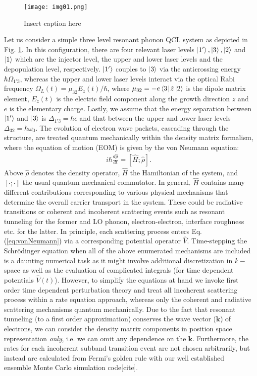 \documentclass[10pt,letterpaper]{article}
\begin{document}
\begin{figure}[h!]
\centering
\texttt{[image: img01.png]}
\caption{Insert caption here} \label{fig:img01}
\end{figure}

Let us consider a simple three level resonant phonon QCL system as depicted in Fig. \ref{fig:img01}. In this configuration, there are four relevant laser levels $\Ket{1'}, \Ket{3}, \Ket{2} $ and $\Ket{1}$ which are the injector level, the upper and lower laser levels and the depopulation level, respectively. $\Ket{1'}$ couples to $\Ket{3}$ via the anticrossing energy $\hbar\Omega_{1'3}$, whereas the upper and lower laser levels interact via the optical Rabi frequency $\Omega_L(t)= \mu_{32}E_z(t)/\hbar$, where $\mu_{32} = -e \Bra{3}\hat{z} \Ket{2}$ is the dipole matrix element, $E_z(t)$ is the electric field component along the growth direction $z$ and $e$ is the elementary charge. Lastly, we assume that the energy separation between $\Ket{1'}$ and $\Ket{3}$ is $\Delta_{1'3} = \hbar \epsilon$ and that between the upper and lower laser levels $\Delta_{32} = \hbar \omega_0$.
The evolution of electron wave packets, cascading through the structure, are treated quantum mechanically within the density matrix formalism, where the equation of motion (EOM) is given by the von Neumann equation:
\begin{align}
 \label{eq:vonNeumann}
 i\hbar \frac{d \hat{\rho}}{dt} = [\hat{H};\hat{\rho}].
\end{align}
Above $\hat{\rho}$ denotes the density operator, $\hat{H}$ the Hamiltonian of the system, and $[\cdot;\cdot]$ the usual quantum mechanical commutator. In general, $\hat{H}$ contains many different contributions corresponding to various physical mechanisms that determine the overall carrier transport in the system. These could be radiative transitions or coherent and incoherent scattering events such as resonant tunneling for the former and LO phonon, electron-electron, interface roughness etc. for the latter. In principle, each scattering process enters Eq. (\ref{eq:vonNeumann}) via a corresponding potential operator $\hat{V}$. Time-stepping the Schrödinger equation when all of the above enumerated mechanisms are included is a daunting numerical task as it might involve additional discretization in $k-$space as well as the evaluation of complicated integrals (for time dependent potentials $\hat{V}(t)$). However, to simplify the equations at hand we  invoke first order time dependent perturbation theory and treat all incoherent scattering process within a rate equation approach, whereas only the coherent and radiative scattering mechanisms quantum mechanically. Due to the fact that resonant tunneling (to a first order approximation) conserves the wave vector ($\mathbf{k}$) of electrons, we can consider the density matrix components in position space representation \emph{only}, i.e. we can omit any dependence on the $\mathbf{k}$. Furthermore, the rates for each incoherent subband transition event are not chosen arbitrarily, but instead are calculated from Fermi's golden rule with our well established ensemble Monte Carlo simulation code[cite]. 
\end{document}
